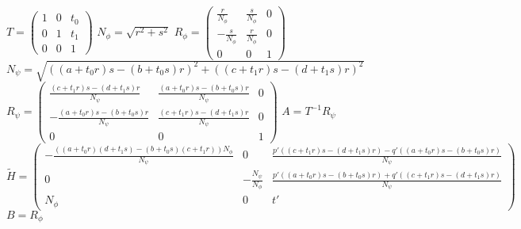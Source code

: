 \documentclass[a4paper,11pt]{article}
\newcommand{\pmatrice}[1]{\begin{pmatrix} #1 \end{pmatrix}}
\newenvironment{algorithme}{\begin{algorithm}[H]}{\end{algorithm}}
\begin{document}
   \begin{algorithme}
     \caption{$decomposition(H)$}
     $T = \pmatrice{1&0&t_0\\0&1&t_1\\0&0&1}$\;
     $N_\phi = \sqrt{r^2+s^2}$\;
     $R_\phi = \pmatrice{
      \frac{r}{N_\phi} & \frac{s}{N_\phi} & 0\\
      -\frac{s}{N_\phi} & \frac{r}{N_\phi} & 0\\
      0 & 0 & 1}$\;
     $N_\psi = \sqrt{((a+t_0r)s-(b+t_0s)r)^2+((c+t_1r)s-(d+t_1s)r)^2}$\;
     $R_\psi = \pmatrice{
      \frac{(c+t_1r)s-(d+t_1s)r}{N_\psi} & \frac{(a+t_0r)s-(b+t_0s)r}{N_\psi} & 0\\
      -\frac{(a+t_0r)s-(b+t_0s)r}{N_\psi} & \frac{(c+t_1r)s-(d+t_1s)r}{N_\psi} & 0\\
      0 & 0 & 1}$\;
     $A = T^{-1}R_\psi$\;
     $\tilde H = \pmatrice{
      -\frac{((a+t_0r)(d+t_1s)-(b+t_0s)(c+t_1r))N_\phi}{N_\psi} & 0 & \frac{p'((c+t_1r)s-(d+t_1s)r)-q'((a+t_0r)s-(b+t_0s)r)}{N_\psi}\\
      0 & -\frac{N_\psi}{N_\phi} & \frac{p'((a+t_0r)s-(b+t_0s)r)+q'((c+t_1r)s-(d+t_1s)r)}{N_\psi}\\
      N_\phi & 0 & t'}$\;
     $B = R_\phi$\;
   \end{algorithme}
\end{document}

